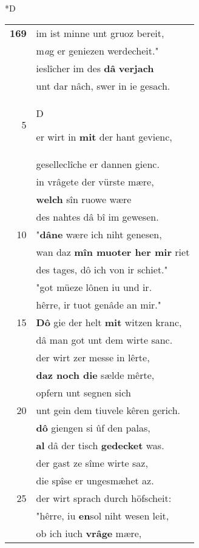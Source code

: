 \documentclass[8pt,a4paper,notitlepage]{article}
\begin{document}
\begin{table}[ht]
\begin{minipage}[t]{0.5\linewidth}
\small
\begin{center}*D
\end{center}
\begin{tabular}{rl}
\textbf{169} & im ist minne unt gruoz bereit,\\ 
 & m\textit{a}g er geniezen werdecheit."\\ 
 & ieslîcher im des \textbf{dâ} \textbf{verjach}\\ 
 & unt dar nâch, swer in ie gesach.\\ 
5 & \begin{large}D\end{large}er wirt in \textbf{mit} der hant gevienc,\\ 
 & geselleclîche er dannen gienc.\\ 
 & in vrâgete der vürste mære,\\ 
 & \textbf{welch} sîn ruowe wære\\ 
 & des nahtes dâ bî im gewesen.\\ 
10 & "\textbf{dâ}\textbf{ne} wære ich niht genesen,\\ 
 & wan daz \textbf{mîn muoter her mir} riet\\ 
 & des tages, dô ich von ir schiet."\\ 
 & "got müeze lônen iu und ir.\\ 
 & hêrre, ir tuot genâde an mir."\\ 
15 & \textbf{Dô} gie der helt \textbf{mit} witzen kranc,\\ 
 & dâ man got unt dem wirte sanc.\\ 
 & der wirt zer messe in lêrte,\\ 
 & \textbf{daz noch die} sælde mêrte,\\ 
 & opfern unt segnen sich\\ 
20 & unt gein dem tiuvele kêren gerich.\\ 
 & \textbf{dô} giengen si ûf den palas,\\ 
 & \textbf{al} dâ der tisch \textbf{gedecket} was.\\ 
 & der gast ze sîme wirte saz,\\ 
 & die spîse er ungesmæhet az.\\ 
25 & der wirt sprach durch höfscheit:\\ 
 & "hêrre, iu \textbf{en}sol niht wesen leit,\\ 
 & ob ich iuch \textbf{vrâge} mære,\\ 

\end{tabular}
\end{minipage}
\end{table}
\end{document}

